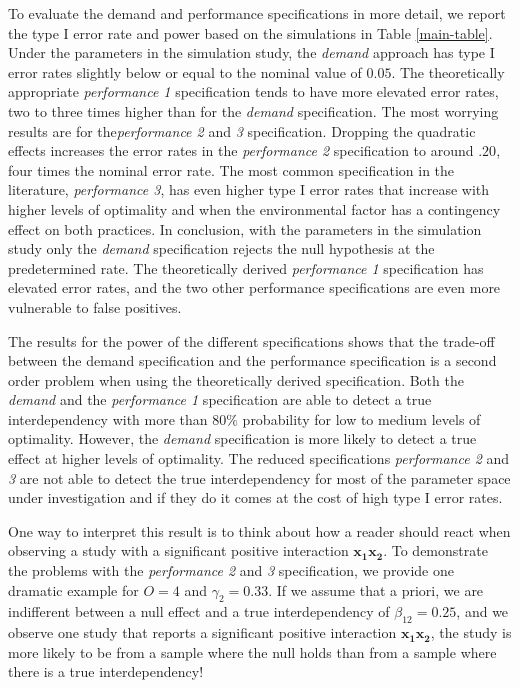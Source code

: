 \documentclass[12pt]{article}
\begin{document}
To evaluate the demand and performance specifications in more detail, we report the type I error rate and power based on the simulations in Table \ref{main-table}. Under the parameters in the simulation study, the \emph{demand} approach has type I error rates slightly below or equal to the nominal value of \(0.05\). The theoretically appropriate \emph{performance 1} specification tends to have more elevated error rates, two to three times higher than for the \emph{demand} specification. The most worrying results are for the\emph{performance 2} and \emph{3} specification. Dropping the quadratic effects increases the error rates in the \emph{performance 2} specification to around \(.20\), four times the nominal error rate. The most common specification in the literature, \emph{performance 3}, has even higher type I error rates that increase with higher levels of optimality and when the environmental factor has a contingency effect on both practices. In conclusion, with the parameters in the simulation study only the \emph{demand} specification rejects the null hypothesis at the predetermined rate. The theoretically derived \emph{performance 1} specification has elevated error rates, and the two other performance specifications are even more vulnerable to false positives.

The results for the power of the different specifications shows that the trade-off between the demand specification and the performance specification is a second order problem when using the theoretically derived specification. Both the \emph{demand} and the \emph{performance 1} specification are able to detect a true interdependency with more than $80\%$ probability for low to medium levels of optimality. However, the \emph{demand} specification is more likely to detect a true effect at higher levels of optimality. The reduced specifications \emph{performance 2} and \emph{3} are not able to detect the true interdependency for most of the parameter space under investigation and if they do it comes at the cost of high type I error rates.

One way to interpret this result is to think about how a reader should react when observing a study with a significant positive interaction \(\mathbf{x_1 x_2}\). To demonstrate the problems with the \emph{performance 2} and \emph{3} specification, we provide one dramatic example for \(O = 4\) and \(\gamma_2 = 0.33\). If we assume that a priori, we are indifferent between a null effect and a true interdependency of \(\beta_{12} = 0.25\), and we observe one study that reports a significant positive interaction \(\mathbf{x_{1} x_{2}}\), the study is more likely to be from a sample where the null holds than from a sample where there is a true interdependency!
\end{document}
